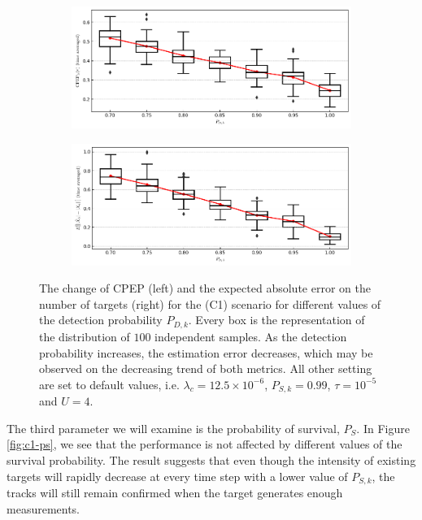 \begin{figure}
    \centering
    \begin{subfigure}[]{0.48\linewidth}
        \centering
        \includegraphics[width=\linewidth]{figures/c1-pd-cpep.png}
    \end{subfigure}
    \hfill
    \begin{subfigure}[]{0.48\linewidth}
        \centering
        \includegraphics[width=\linewidth]{figures/c1-pd-eae.png}
    \end{subfigure}
  \caption[(C1). Change of performance depending on the detection probability.]{The change of CPEP (left) and the expected absolute error on the number of targets (right) for the (C1) scenario for different values of the detection probability $P_{D,k}$. Every box is the representation of the distribution of $100$ independent samples. As the detection probability increases, the estimation error decreases, which may be observed on the decreasing trend of both metrics. All other setting are set to default values, i.e. $\lambda_{c} = 12.5 \times 10^{-6}$, $P_{S,k} = 0.99$, $\tau = 10^{-5}$ and $U = 4$.}
  \label{fig:c1-pd}
\end{figure}

The third parameter we will examine is the probability of survival, $P_S$. In Figure \ref{fig:c1-ps}, we see that the performance is not affected by different values of the survival probability. The result suggests that even though the intensity of existing targets will rapidly decrease at every time step with a lower value of $P_{S,k}$, the tracks will still remain confirmed when the target generates enough measurements.

